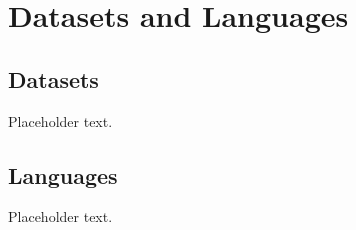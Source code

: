 \chapter{Datasets and Languages}\label{chapter:datasets}

\section{Datasets}

Placeholder text.

\section{Languages}

Placeholder text.